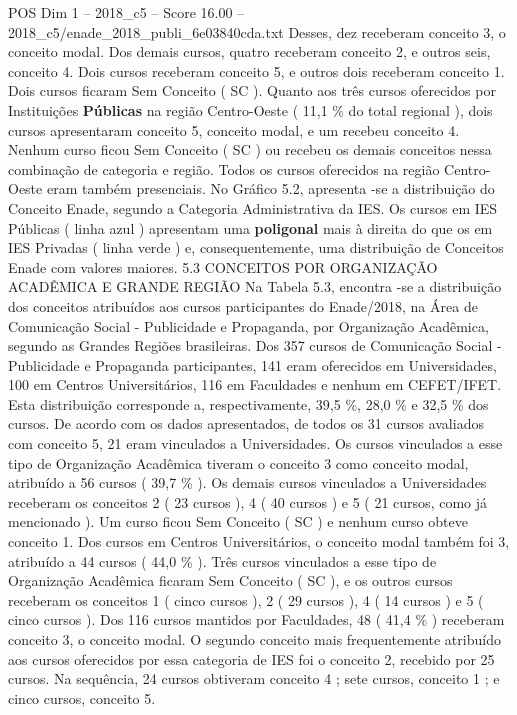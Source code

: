 \begin{textsample}{POS Dim 1 – 2018\_c5 – Score 16.00 – 2018\_c5/enade\_2018\_publi\_6e03840cda.txt}
Desses, dez receberam conceito 3, o conceito modal.
Dos demais cursos, quatro receberam conceito 2, e outros seis, conceito 4.
Dois cursos receberam conceito 5, e outros dois receberam conceito 1.
Dois cursos ficaram Sem Conceito ( SC ).
Quanto aos três cursos oferecidos por Instituições \textbf{Públicas} na região Centro-Oeste ( 11,1 \% do total regional ), dois cursos apresentaram conceito 5, conceito modal, e um recebeu conceito 4.
Nenhum curso ficou Sem Conceito ( SC ) ou recebeu os demais conceitos nessa combinação de categoria e região.
Todos os cursos oferecidos na região Centro-Oeste eram também presenciais.
No Gráfico 5.2, apresenta -se a distribuição do Conceito Enade, segundo a Categoria Administrativa da IES.
Os cursos em IES Públicas ( linha azul ) apresentam uma \textbf{poligonal} mais à direita do que os em IES Privadas ( linha verde ) e, consequentemente, uma distribuição de Conceitos Enade com valores maiores. 5.3 CONCEITOS POR ORGANIZAÇÃO ACADÊMICA E GRANDE REGIÃO Na Tabela 5.3, encontra -se a distribuição dos conceitos atribuídos aos cursos participantes do Enade/2018, na Área de Comunicação Social - Publicidade e Propaganda, por Organização Acadêmica, segundo as Grandes Regiões brasileiras.
Dos 357 cursos de Comunicação Social - Publicidade e Propaganda participantes, 141 eram oferecidos em Universidades, 100 em Centros Universitários, 116 em Faculdades e nenhum em CEFET/IFET.
Esta distribuição corresponde a, respectivamente, 39,5 \%, 28,0 \% e 32,5 \% dos cursos.
De acordo com os dados apresentados, de todos os 31 cursos avaliados com conceito 5, 21 eram vinculados a Universidades.
Os cursos vinculados a esse tipo de Organização Acadêmica tiveram o conceito 3 como conceito modal, atribuído a 56 cursos ( 39,7 \% ).
Os demais cursos vinculados a Universidades receberam os conceitos 2 ( 23 cursos ), 4 ( 40 cursos ) e 5 ( 21 cursos, como já mencionado ).
Um curso ficou Sem Conceito ( SC ) e nenhum curso obteve conceito 1.
Dos cursos em Centros Universitários, o conceito modal também foi 3, atribuído a 44 cursos ( 44,0 \% ).
Três cursos vinculados a esse tipo de Organização Acadêmica ficaram Sem Conceito ( SC ), e os outros cursos receberam os conceitos 1 ( cinco cursos ), 2 ( 29 cursos ), 4 ( 14 cursos ) e 5 ( cinco cursos ).
Dos 116 cursos mantidos por Faculdades, 48 ( 41,4 \% ) receberam conceito 3, o conceito modal.
O segundo conceito mais frequentemente atribuído aos cursos oferecidos por essa categoria de IES foi o conceito 2, recebido por 25 cursos.
Na sequência, 24 cursos obtiveram conceito 4 ; sete cursos, conceito 1 ; e cinco cursos, conceito 5.

\end{textsample}
